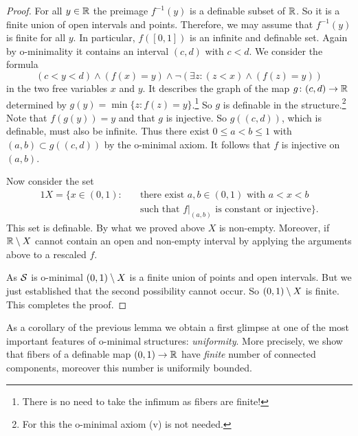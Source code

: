 \begin{proof}
  For all $y\in{\mathbb{R}}$ the preimage $f^{-1}(y)$ is a definable subset of
  ${\mathbb{R}}$. So it is a finite union of open intervals and points.
  Therefore, we may assume that  $f^{-1}(y)$ is finite for all $y$.
  In particular, $f([0,1])$ is an infinite and definable set. Again by
  o-minimality it contains an interval $(c,d)$ with $c<d$.
  We consider the formula 
  \begin{equation*}
    (c<y<d) \wedge (f(x)=y) \wedge \neg (\exists z : (z<x) \wedge (f(z)=y))
  \end{equation*}
  in the two free variables $x$ and $y$. It describes the graph
  of the map $g\colon (c,d)\rightarrow {\mathbb{R}}$ determined by
  $g(y) = \min\{z : f(z)=y\}$.\footnote{There is no need to take the
    infimum as fibers are finite!} So  $g$ is
  definable in the structure.\footnote{For this the o-minimal axiom
    (v) is not needed.} Note that $f(g(y))=y$ and that $g$ is
  injective. So $g((c,d))$, which is definable, must also be infinite.
  Thus there exist $0\le a<b\le 1$ with $(a,b)\subset g((c,d))$ by the
  o-minimal axiom. It follows that $f$ is injective on $(a,b)$.

  Now consider the set
  \begin{alignat*}1
    X=\{ x\in (0,1): \quad &\text{there exist $a,b\in (0,1)$ with $a<x<b$}
    \\ &\text{such
      that
      $f|_{(a,b)}$ is constant or injective}\}. 
  \end{alignat*}
  This set is definable. By what we proved above $X$ is non-empty.
  Moreover, if ${\mathbb{R}}\setminus X$ cannot contain an open and non-empty
  interval by applying the arguments above to a rescaled $f$.
  
  As ${\mathcal S}$ is o-minimal $(0,1)\setminus X$ is a finite union of points and
  open intervals. But we just established that the second possibility
  cannot occur. So $(0,1)\setminus X$ is finite. This completes the proof. 
\end{proof}

As a corollary of the previous lemma we obtain a first glimpse at one
of the most important features of o-minimal structures:
\emph{uniformity}. More precisely, we show that fibers of a definable
map $(0,1)\rightarrow{\mathbb{R}}$ have \emph{finite} number of connected
components, moreover this number is uniformily bounded. 

